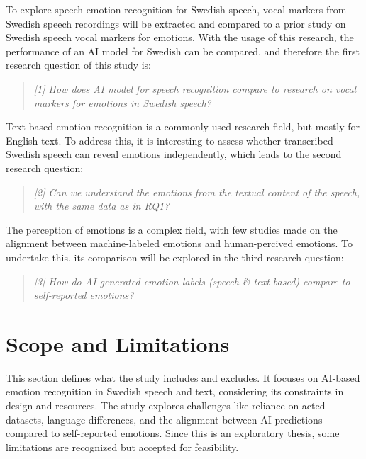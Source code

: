 To explore speech emotion recognition for Swedish speech, vocal markers from Swedish speech recordings will be extracted and compared to a prior study \autocite{Ekberg2023} on Swedish speech vocal markers for emotions. With the usage of this research, the performance of an AI model for Swedish can be compared, and therefore the first research question of this study is: 

\begin{quote}
\textit{[1] How does AI model for speech recognition compare to research on vocal markers for emotions in Swedish speech?} 
\end{quote}
Text-based emotion recognition is a commonly used research field, but mostly for English text. To address this, it is interesting to assess whether transcribed Swedish speech can reveal emotions independently, which leads to the second research question: 
\begin{quote}
    \textit{[2] Can we understand the emotions from the textual content of the speech, with the same data as in RQ1?}
\end{quote}
The perception of emotions is a complex field, with few studies made on the alignment between machine-labeled emotions and human-percived emotions. To undertake this, its comparison will be explored in the third research question:  
\begin{quote}
    \textit{[3] How do AI-generated emotion labels (speech \& text-based) compare to self-reported emotions?}
\end{quote}

\section{Scope and Limitations}
This section defines what the study includes and excludes. It focuses on AI-based emotion recognition in Swedish speech and text, considering its constraints in design and resources. The study explores challenges like reliance on acted datasets, language differences, and the alignment between AI predictions compared to self-reported emotions. Since this is an exploratory thesis, some limitations are recognized but accepted for feasibility. 
